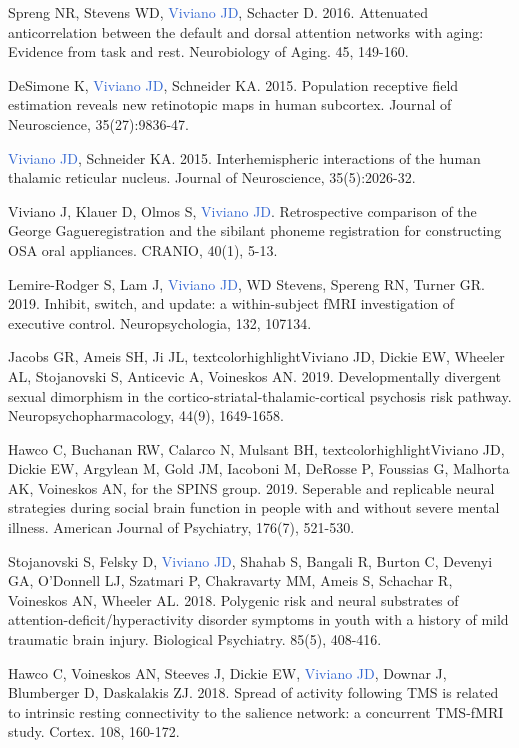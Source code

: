 \documentclass[a4paper,11pt,oneside]{book}
\newcommand\paper[1]{
    #1\\
    \vspace{3.5mm}
}
\begin{document}
\begin{flushleft}
\paper{Spreng NR, Stevens WD, \textcolor{highlight}{Viviano JD}, Schacter D. 2016. Attenuated anticorrelation between the default and dorsal attention networks with aging: Evidence from task and rest. Neurobiology of Aging. 45, 149-160.}

\paper{DeSimone K, \textcolor{highlight}{Viviano JD}, Schneider KA. 2015. Population receptive field estimation reveals new retinotopic maps in human subcortex. Journal of Neuroscience, 35(27):9836-47.}

\paper{\textcolor{highlight}{Viviano JD}, Schneider KA. 2015. Interhemispheric interactions of the human thalamic reticular nucleus. Journal of Neuroscience, 35(5):2026-32.}

\paper{Viviano J, Klauer D, Olmos S, \textcolor{highlight}{Viviano JD}. Retrospective comparison of the George Gague\texttrademark registration and the sibilant phoneme registration for constructing OSA oral appliances. CRANIO, 40(1), 5-13.}

\paper{Lemire-Rodger S, Lam J, \textcolor{highlight}{Viviano JD}, WD Stevens, Spereng RN, Turner GR. 2019. Inhibit, switch, and update: a within-subject fMRI investigation of executive control. Neuropsychologia, 132, 107134.}

\paper{Jacobs GR, Ameis SH, Ji JL, textcolor{highlight}{Viviano JD}, Dickie EW, Wheeler AL, Stojanovski S, Anticevic A, Voineskos AN. 2019. Developmentally divergent sexual dimorphism in the cortico-striatal-thalamic-cortical psychosis risk pathway. Neuropsychopharmacology, 44(9), 1649-1658.}

\paper{Hawco C, Buchanan RW, Calarco N, Mulsant BH, textcolor{highlight}{Viviano JD}, Dickie EW, Argylean M, Gold JM, Iacoboni M, DeRosse P, Foussias G, Malhorta AK, Voineskos AN, for the SPINS group. 2019. Seperable and replicable neural strategies during social brain function in people with and without severe mental illness. American Journal of Psychiatry, 176(7), 521-530.}

\paper{Stojanovski S, Felsky D, \textcolor{highlight}{Viviano JD}, Shahab S, Bangali R, Burton C, Devenyi GA, O'Donnell LJ, Szatmari P, Chakravarty MM, Ameis S, Schachar R, Voineskos AN, Wheeler AL. 2018. Polygenic risk and neural substrates of attention-deficit/hyperactivity disorder symptoms in youth with a history of mild traumatic brain injury. Biological Psychiatry. 85(5), 408-416.}

\paper{Hawco C, Voineskos AN,  Steeves J, Dickie EW, \textcolor{highlight}{Viviano JD}, Downar J, Blumberger D, Daskalakis ZJ. 2018. Spread of activity following TMS is related to intrinsic resting connectivity to the salience network: a concurrent TMS-fMRI study. Cortex. 108, 160-172.}


\end{flushleft}
\end{document}
